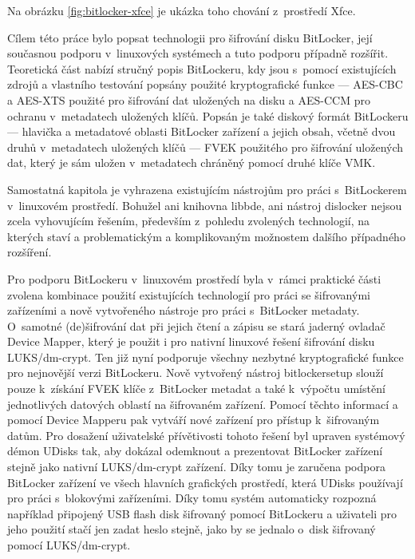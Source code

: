 Na obrázku \ref{fig:bitlocker-xfce} je ukázka toho chování z~prostředí Xfce.



Cílem této práce bylo popsat technologii pro šifrování disku BitLocker, její současnou podporu v~linuxových systémech a tuto podporu případně rozšířit. Teoretická část nabízí stručný popis BitLockeru, kdy jsou s~pomocí existujících zdrojů a vlastního testování popsány použité kryptografické funkce --- AES-CBC a AES-XTS použité pro šifrování dat uložených na disku a AES-CCM pro ochranu v~metadatech uložených klíčů. Popsán je také diskový formát BitLockeru --- hlavička a metadatové oblasti BitLocker zařízení a jejich obsah, včetně dvou druhů v~metadatech uložených klíčů --- FVEK použitého pro šifrování uložených dat, který je sám uložen v~metadatech chráněný pomocí druhé klíče VMK.

Samostatná kapitola je vyhrazena existujícím nástrojům pro práci s~BitLockerem v~linuxovém prostředí. Bohužel ani knihovna libbde, ani nástroj dislocker nejsou zcela vyhovujícím řešením, především z~pohledu zvolených technologií, na kterých staví a problematickým a komplikovaným možnostem dalšího případného rozšíření.

Pro podporu BitLockeru v~linuxovém prostředí byla v~rámci praktické části zvolena kombinace použití existujících technologií pro práci se šifrovanými zařízeními a nově vytvořeného nástroje pro práci s~BitLocker metadaty. O~samotné (de)šifrování dat při jejich čtení a zápisu se stará jaderný ovladač Device Mapper, který je použit i pro nativní linuxové řešení šifrování disku LUKS/dm-crypt. Ten již nyní podporuje všechny nezbytné kryptografické funkce pro nejnovější verzi BitLockeru. Nově vytvořený nástroj bitlockersetup slouží pouze k~získání FVEK klíče z~BitLocker metadat a také k~výpočtu umístění jednotlivých datových oblastí na šifrovaném zařízení. Pomocí těchto informací a pomocí Device Mapperu pak vytváří nové zařízení pro přístup k~šifrovaným datům. Pro dosažení uživatelské přívětivosti tohoto řešení byl upraven systémový démon \mbox{UDisks} tak, aby dokázal odemknout a prezentovat BitLocker zařízení stejně jako nativní LUKS/dm-crypt zařízení. Díky tomu je zaručena podpora BitLocker zařízení ve všech hlavních grafických prostředí, která UDisks používají pro práci s~blokovými zařízeními. Díky tomu systém automaticky rozpozná například připojený USB flash disk šifrovaný pomocí BitLockeru a uživateli pro jeho použití stačí jen zadat heslo stejně, jako by se jednalo o~disk šifrovaný pomocí LUKS/dm-crypt.

